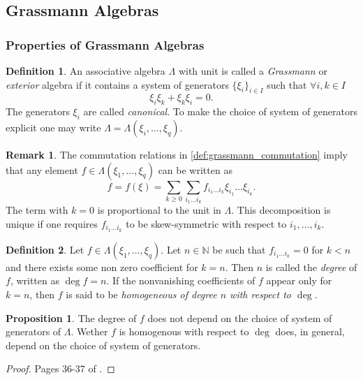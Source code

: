 \documentclass{article}
\theoremstyle{definition}
\newtheorem{definition}{Definition}
\newtheorem{proposition}{Proposition}
\newtheorem*{remark}{Remark}
\begin{document}


\subsection{Grassmann Algebras}
\subsubsection{Properties of Grassmann Algebras}


\begin{definition}
    An associative algebra $\Lambda$ with unit is called a \emph{Grassmann} or \emph{exterior} algebra if it contains a system of generators $\{ \xi_i \}_{i \in I}$ such that $\forall i, k \in I$
    \begin{equation}
        \label{def:grassmann_commutation}
        \xi_i \xi_k + \xi_k \xi_i = 0.
    \end{equation}
    The generators $\xi_i$ are called \emph{canonical}. To make the choice of system of generators explicit one may write $\Lambda = \Lambda (\xi_i, \dots, \xi_q)$.
\end{definition}

\begin{remark}
    The commutation relations in \eqref{def:grassmann_commutation} imply that any element $f \in \Lambda(\xi_1, \dots, \xi_q)$ can be written as
    \begin{equation}
        \label{eq:grassmann_element}
        f = f(\xi) = \sum_{k \geq 0} \sum_{i_1 \dots i_k}
        f_{i_1 \dots i_k} \xi_{i_1} \dots \xi_{i_k}.
    \end{equation}
    The term with $k = 0$ is proportional to the unit in $\Lambda$. This decomposition is unique if one requires $f_{i_1 \dots i_k}$ to be skew-symmetric with respect to $i_1, \dots, i_k$.
\end{remark}

\begin{definition}
    Let $f \in \Lambda(\xi_1, \dots, \xi_q)$. Let $n \in \mathbb{N}$ be such that $f_{i_1 \dots i_k} = 0$ for $k < n$ and there exists some non zero coefficient for $k = n$. Then $n$ is called the \emph{degree} of $f$, written as $\deg f = n$. If the nonvanishing coefficients of $f$ appear only for $k = n$, then $f$ is said to be \emph{homogeneous of degree $n$ with respect to $\deg$}.
\end{definition}

\begin{proposition}
    The degree of $f$ does not depend on the choice of system of generators of $\Lambda$. Wether $f$ is homogenous with respect to $\deg$ does, in general, depend on the choice of system of generators.
\end{proposition}
\begin{proof}
    Pages 36-37 of \cite{berezin_introduction_1987}.
\end{proof}
\end{document}
